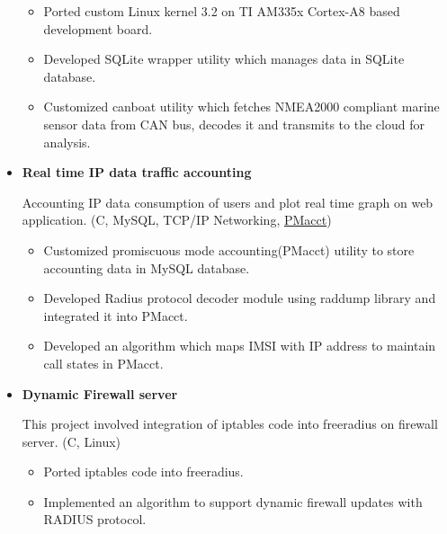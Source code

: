 \documentclass[letterpaper,11pt]{article}
\newcommand{\resitem}[1]{\item #1 \vspace{-2pt}}
\begin{document}
\begin{itemize}
	\begin{itemize}
	    \resitem{Ported custom Linux kernel 3.2 on TI AM335x Cortex-A8 based development board.}
	    
	    \resitem{Developed SQLite wrapper utility which manages data in SQLite database.}
	    
	    \resitem{Customized canboat utility which fetches NMEA2000 compliant marine sensor data from CAN bus, decodes it and transmits to the cloud for analysis.}

	\end{itemize}

\item
    \textbf{Real time IP data traffic accounting}
    
    Accounting IP data consumption of users and plot real time graph on web application. (C, MySQL, TCP/IP Networking, \href{https://github.com/mehul-m-prajapati/pmacct}{PMacct})
	\begin{itemize}
	    \resitem{Customized promiscuous mode accounting(PMacct) utility to store accounting data in MySQL database.}
	
	    \resitem{Developed Radius protocol decoder module using raddump library and integrated it into PMacct.}
	    
	    \resitem{Developed an algorithm which maps IMSI with IP address to maintain call states in PMacct.}
	    
	\end{itemize}
	
\item
	\textbf{Dynamic Firewall server}
	
	This project involved integration of iptables code into freeradius on firewall server. (C, Linux)
	
	\begin{itemize}
	    \resitem{Ported iptables code into freeradius. }
	    
	    \resitem{Implemented an algorithm to support dynamic firewall updates with RADIUS protocol.}
	
	\end{itemize}
	
\end{itemize}
\end{document}
